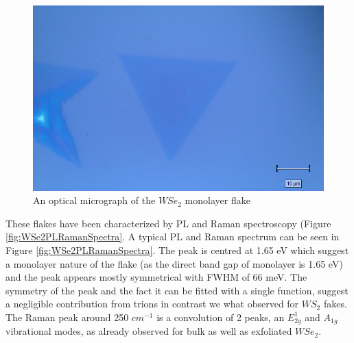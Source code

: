 \begin{figure}[!h]
	\begin{center}
		\includegraphics[scale=0.5]{WSe2/OMMap.png}
		\caption{An optical micrograph of the $WSe_2$ monolayer flake}
		\label{fig:WSe2OMMap}
	\end{center}
\end{figure}

These flakes have been characterized by PL and Raman spectroscopy (Figure \ref{fig:WSe2PLRamanSpectra}. A typical PL and Raman spectrum can be seen in Figure \ref{fig:WSe2PLRamanSpectra}. The peak is centred at 1.65 eV which suggest a monolayer nature of the flake (as the direct band gap of monolayer is 1.65 eV) and the peak appears mostly symmetrical with FWHM of 66 meV. The symmetry of the peak and the fact it can be fitted with a single function, suggest a negligible contribution from trions in contrast we what observed for $WS_2$  fakes. The Raman peak around 250 $cm^{-1}$ is a convolution of 2 peaks, an $E^1_{2g}$ and $A_{1g}$ vibrational modes, as already observed for bulk as well as exfoliated $WSe_2$.

